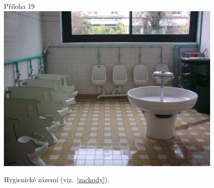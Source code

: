 	\begin{figure}[tb]
		\centering
		Příloha 19\\
		\includegraphics[height=0.35\textheight]{./fotky/Obr19.jpg}
		\caption{
			Hygienické zázemí (viz.~\ref{zachody}).
		}
		\label{Obr19}
	\end{figure}

